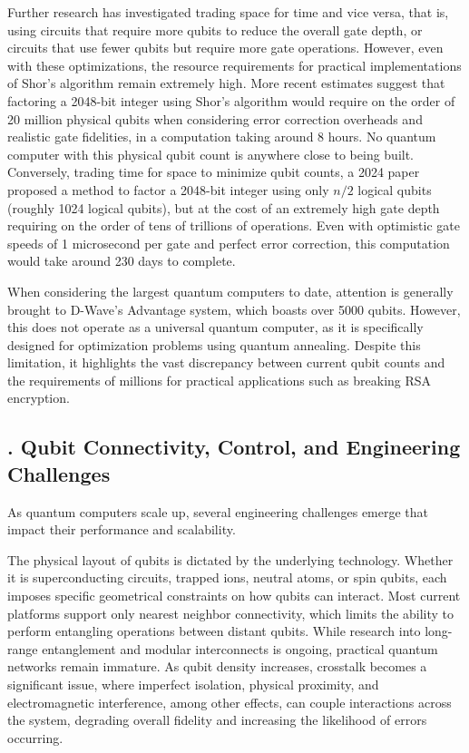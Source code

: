 \documentclass{elbioimp2}
\begin{document}
Further research has investigated trading space for time and vice versa, that is, using circuits that require more qubits to reduce the overall gate depth, or circuits that use fewer qubits but require more gate operations. However, even with these optimizations, the resource requirements for practical implementations of Shor's algorithm remain extremely high. More recent estimates suggest that factoring a 2048-bit integer using Shor's algorithm would require on the order of 20 million physical qubits when considering error correction overheads and realistic gate fidelities, in a computation taking around 8 hours\cite{Gidney_2021}. No quantum computer with this physical qubit count is anywhere close to being built. Conversely, trading time for space to minimize qubit counts, a 2024 paper proposed a method to factor a 2048-bit integer using only $n/2$ logical qubits (roughly 1024 logical qubits), but at the cost of an extremely high gate depth requiring on the order of tens of trillions of operations\cite{10.1007/978-3-032-01878-6_13}. Even with optimistic gate speeds of 1 microsecond per gate and perfect error correction, this computation would take around 230 days to complete.

When considering the largest quantum computers to date, attention is generally brought to D-Wave's Advantage system, which boasts over 5000 qubits\cite{NatureQC2023}. However, this does not operate as a universal quantum computer, as it is specifically designed for optimization problems using quantum annealing. Despite this limitation, it highlights the vast discrepancy between current qubit counts and the requirements of millions for practical applications such as breaking RSA encryption.


\subsection{. Qubit Connectivity, Control, and Engineering Challenges}


As quantum computers scale up, several engineering challenges emerge that impact their performance and scalability.

The physical layout of qubits is dictated by the underlying technology. Whether it is superconducting circuits, trapped ions, neutral atoms, or spin qubits, each imposes specific geometrical constraints on how qubits can interact. Most current platforms support only nearest neighbor connectivity, which limits the ability to perform entangling operations between distant qubits. While research into long-range entanglement and modular interconnects is ongoing, practical quantum networks remain immature. As qubit density increases, crosstalk becomes a significant issue, where imperfect isolation, physical proximity, and electromagnetic interference, among other effects, can couple interactions across the system, degrading overall fidelity and increasing the likelihood of errors occurring.
\end{document}
